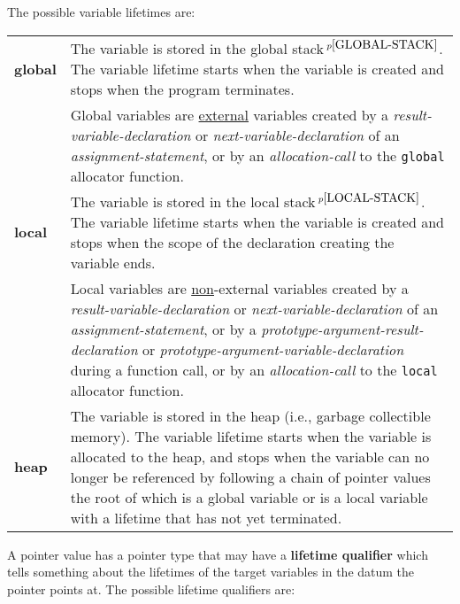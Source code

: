 \documentclass[12pt]{article}
\newcommand{\key}[1]{{\rm \bfseries #1}}
\newcommand{\pagnote}[1]{$\,^{p\pageref{#1}}$}
\newenvironment{indpar}[1][0.3in]%
	{\begin{list}{}%
		     {\setlength{\itemsep}{0in}%
		      \setlength{\topsep}{0in}%
		      \setlength{\parsep}{1ex}%
		      \setlength{\labelwidth}{#1}%
		      \setlength{\leftmargin}{#1}%
		      \addtolength{\leftmargin}{\labelsep}}%
	 \item}%
	{\end{list}}
\begin{document}
The possible variable lifetimes are:
\begin{indpar}[0.2in]
\begin{tabular}{lp{5.0in}}
\key{global} &
	The variable is stored in the global stack\pagnote{GLOBAL-STACK}.
	The variable lifetime starts when the variable is created
	and stops when the program terminates.
	\\[1ex]
	&
	Global variables are \underline{external} variables created by
	a {\em result-variable-declaration} or {\em next-variable-declaration}
	of an {\em assignment-state\-ment}, or by an {\em allocation-call}
	to the {\tt global} allocator function.

\\[1ex]
\key{local} &
	The variable is stored in the local stack\pagnote{LOCAL-STACK}.
	The variable lifetime starts when the variable is created
	and stops when the scope of the declaration creating the
	variable ends.
	\\[1ex]
	&
	Local variables are \underline{non}-external variables created by
	a {\em result-variable-declaration} or
	{\em next-variable-declaration}
	of an {\em assignment-state\-ment},
	or by a {\em prototype-argument-result-declaration} or
	{\em prototype-argument-variable-declaration} during a
	function call,
	or by an {\em allocation-call}
	to the {\tt local} allocator function.
\\[1ex]
\key{heap} &
	The variable is stored in the heap (i.e., garbage collectible memory).
	The variable lifetime starts when the variable is allocated
	to the heap, and stops when the variable can no longer
        be referenced by following a chain of pointer values
        the root of which is a global variable or is a local variable
        with a lifetime that has not yet terminated.
\end{tabular}
\end{indpar}

A pointer value has a pointer type that may have a \key{lifetime qualifier}
which tells something about the lifetimes of the target variables in the
datum the pointer points at.  The possible lifetime qualifiers are:
\end{document}
